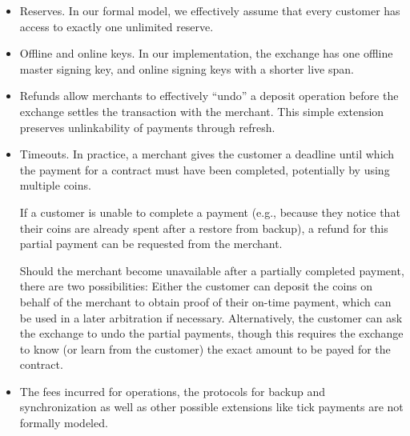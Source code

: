\begin{itemize}
  \item Reserves.  In our formal model, we effectively assume that every customer has access
    to exactly one unlimited reserve.
  \item Offline and online keys.  In our implementation, the exchange
    has one offline master signing key, and online signing keys with
    a shorter live span.
  \item Refunds allow merchants to effectively ``undo'' a deposit operation
    before the exchange settles the transaction with the merchant.  This simple
    extension preserves unlinkability of payments through refresh.
  \item Timeouts.  In practice, a merchant gives the customer a deadline until
    which the payment for a contract must have been completed, potentially by
    using multiple coins.

    If a customer is unable to complete a payment (e.g., because they notice
    that their coins are already spent after a restore from backup), a refund
    for this partial payment can be requested from the merchant.

    Should the merchant become unavailable after a partially completed payment,
    there are two possibilities: Either the customer can deposit the coins on
    behalf of the merchant to obtain proof of their on-time payment, which can
    be used in a later arbitration if necessary.  Alternatively, the customer
    can ask the exchange to undo the partial payments, though this requires the
    exchange to know (or learn from the customer) the exact amount to be payed
    for the contract.


  \item The fees incurred for operations, the protocols for backup and
    synchronization as well as other possible extensions like tick payments are
    not formally modeled.

\end{itemize}

